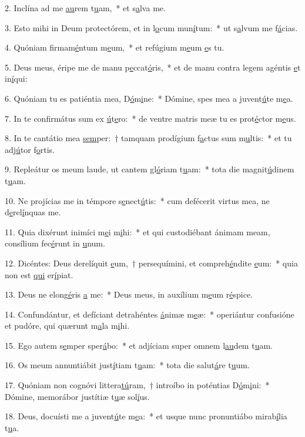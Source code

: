 2. Inclína ad me \uline{au}rem t\uline{u}am,~* et s\uline{a}lva me.\par 
3. Esto mihi in Deum protectórem, et in l\uline{o}cum mun\uline{í}tum:~* ut s\uline{a}lvum me f\uline{á}cias.\par 
4. Quóniam firmam\uline{é}ntum m\uline{e}um,~* et refúgium m\uline{e}um \uline{e}s tu.\par 
5. Deus meus, éripe me de manu p\uline{e}ccat\uline{ó}ris,~* et de manu contra legem agéntis \uline{e}t in\uline{í}qui:\par 
6. Quóniam tu es patiéntia mea, D\uline{ó}m\uline{i}ne:~* Dómine, spes mea a juvent\uline{ú}te m\uline{e}a.\par 
7. In te confirmátus sum ex \uline{ú}t\uline{e}ro:~* de ventre matris meæ tu es prot\uline{é}ctor m\uline{e}us.\par 
8. In te cantátio mea \uline{sem}per:~† tamquam prodígium f\uline{a}ctus sum m\uline{u}ltis:~* et tu adj\uline{ú}tor f\uline{o}rtis.\par 
9. Repleátur os meum laude, ut cantem gl\uline{ó}riam t\uline{u}am:~* tota die magnit\uline{ú}dinem t\uline{u}am.\par 
10. Ne projícias me in témpore s\uline{e}nect\uline{ú}tis:~* cum defécerit virtus mea, ne d\uline{e}rel\uline{í}nquas me.\par 
11. Quia dixérunt inimíci m\uline{e}i m\uline{i}hi:~* et qui custodiébant ánimam meam, consílium fec\uline{é}runt in \uline{u}num.\par 
12. Dicéntes: Deus derelíquit \uline{e}um,~† persequímini, et compreh\uline{é}ndite \uline{e}um:~* quia non est \uline{qui} er\uline{í}piat.\par 
13. Deus ne elong\uline{é}ris \uline{a} me:~* Deus meus, in auxílium m\uline{e}um r\uline{é}spice.\par 
14. Confundántur, et defíciant detrahéntes \uline{á}nimæ m\uline{e}æ:~* operiántur confusióne et pudóre, qui quærunt m\uline{a}la m\uline{i}hi.\par 
15. Ego autem s\uline{e}mper sper\uline{á}bo:~* et adjíciam super omnem l\uline{au}dem t\uline{u}am.\par 
16. Os meum annuntiábit just\uline{í}tiam t\uline{u}am:~* tota die salut\uline{á}re t\uline{u}um.\par 
17. Quóniam non cognóvi littera\uline{tú}ram,~† introíbo in poténtias D\uline{ó}m\uline{i}ni:~* Dómine, memorábor justítiæ t\uline{u}æ sol\uline{í}us.\par 
18. Deus, docuísti me a juvent\uline{ú}te m\uline{e}a:~* et usque nunc pronuntiábo mirab\uline{í}lia t\uline{u}a.\par 
